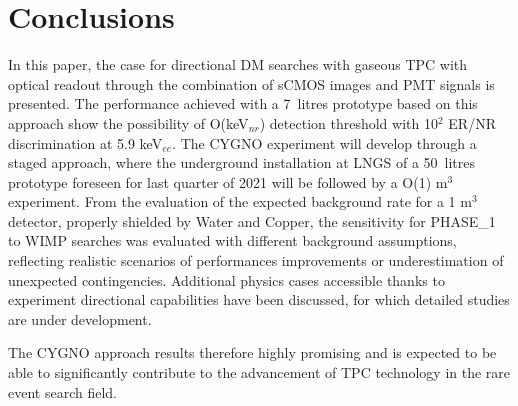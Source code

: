 \documentclass[physics,article,submit,moreauthors,pdftex]{Definitions/mdpi}
\begin{document}


\section{Conclusions}
In this paper, the case for directional DM searches with gaseous TPC with optical readout through the combination of sCMOS images and PMT signals is presented. The performance achieved with a 7~litres prototype based on this approach show the possibility of O(keV$_{nr}$) detection threshold with 10$^2$ ER/NR discrimination at 5.9 keV$_{ee}$.
The CYGNO experiment will develop through a staged approach, where the underground installation at LNGS of a 50~litres prototype foreseen for last quarter of 2021 will be followed by a O(1) m$^3$ experiment. From the evaluation of the expected background rate for a 1 m$^3$ detector, properly shielded by Water and Copper, the sensitivity for PHASE\_1 to WIMP searches was evaluated with different background assumptions, reflecting realistic scenarios of performances improvements or underestimation of unexpected contingencies. Additional  physics cases accessible thanks to experiment directional capabilities have been discussed, for which detailed studies are under development.  

The CYGNO approach results therefore highly promising and is expected to be able to significantly contribute to the advancement of TPC technology in the rare event search field.


\newpage
\appendixstart
\appendix
\end{document}
